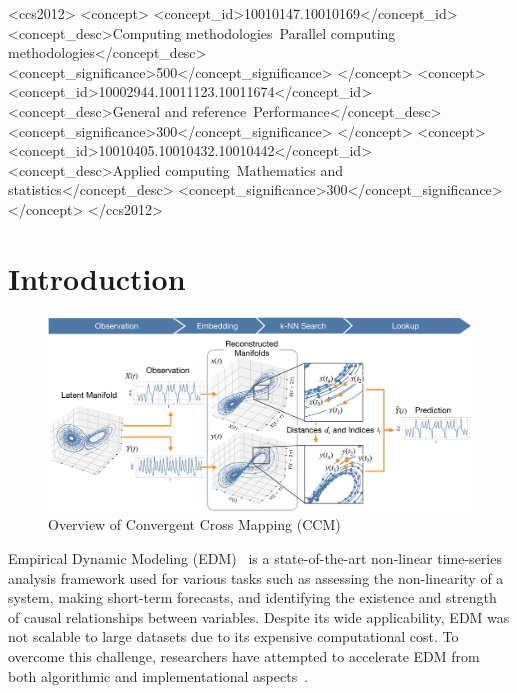 \documentclass{acmart}
\begin{document}

\begin{CCSXML}
<ccs2012>
   <concept>
       <concept_id>10010147.10010169</concept_id>
       <concept_desc>Computing methodologies~Parallel computing methodologies</concept_desc>
       <concept_significance>500</concept_significance>
       </concept>
   <concept>
       <concept_id>10002944.10011123.10011674</concept_id>
       <concept_desc>General and reference~Performance</concept_desc>
       <concept_significance>300</concept_significance>
       </concept>
   <concept>
       <concept_id>10010405.10010432.10010442</concept_id>
       <concept_desc>Applied computing~Mathematics and statistics</concept_desc>
       <concept_significance>300</concept_significance>
       </concept>
 </ccs2012>
\end{CCSXML}


\maketitle

\section{Introduction}

\begin{figure}
    \centering
    \includegraphics[width=.95\linewidth]{figs/xmap_overview}
    \caption{Overview of Convergent Cross Mapping (CCM)}\label{fig:edm}
\end{figure}

Empirical Dynamic Modeling (EDM)~\cite{Chang2017} is a state-of-the-art
non-linear time-series analysis framework used for various tasks such as
assessing the non-linearity of a system, making short-term forecasts, and
identifying the existence and strength of causal relationships between
variables. Despite its wide applicability, EDM was not scalable to large
datasets due to its expensive computational cost. To overcome this challenge,
researchers have attempted to accelerate EDM from both algorithmic and
implementational aspects~\cite{Pu2019,Ma2014}.
\end{document}
